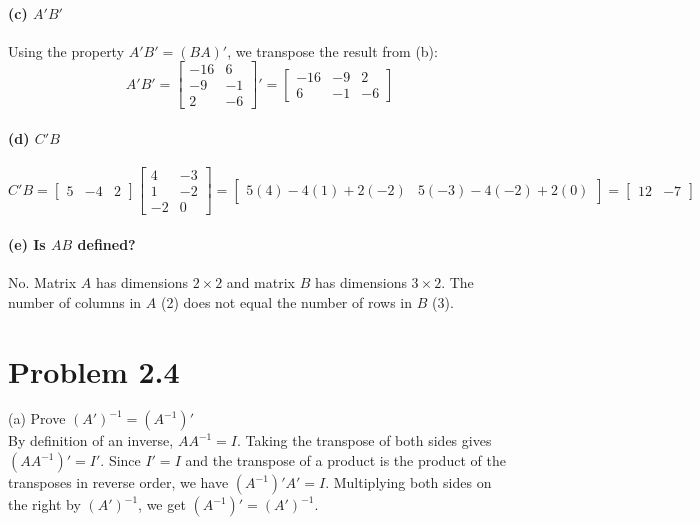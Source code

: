 \documentclass[12pt]{article}
\begin{document}
\paragraph{(c) $A'B'$} 
Using the property $A'B' = (BA)'$, we transpose the result from (b): 
\[
A'B' = \begin{bmatrix} -16 & 6 \\ -9 & -1 \\ 2 & -6 \end{bmatrix}' = \begin{bmatrix} -16 & -9 & 2 \\ 6 & -1 & -6 \end{bmatrix}
\] 

\paragraph{(d) $C'B$} 
\[
C'B = \begin{bmatrix} 5 & -4 & 2 \end{bmatrix} \begin{bmatrix} 4 & -3 \\ 1 & -2 \\ -2 & 0 \end{bmatrix} = \begin{bmatrix} 5(4)-4(1)+2(-2) & 5(-3)-4(-2)+2(0) \end{bmatrix} = \begin{bmatrix} 12 & -7 \end{bmatrix}
\] 

\paragraph{(e) Is $AB$ defined?} 
No. Matrix $A$ has dimensions $2 \times 2$ and matrix $B$ has dimensions $3 \times 2$. The number of columns in $A$ (2) does not equal the number of rows in $B$ (3). 

\section*{Problem 2.4} 
{(a) Prove $(A')^{-1} = (A^{-1})'$}\\


By definition of an inverse, $AA^{-1} = I$. Taking the transpose of both sides gives $(AA^{-1})' = I'$.  
Since $I' = I$ and the transpose of a product is the product of the transposes in reverse order, we have $(A^{-1})'A' = I$. 
Multiplying both sides on the right by $(A')^{-1}$, we get $(A^{-1})' = (A')^{-1}$. \\
\end{document}
